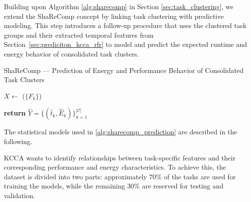 Building upon Algorithm \ref{alg:sharecomp} in Section \ref{sec:task_clustering}, we extend the ShaReComp concept by linking task clustering with predictive modeling. This step introduces a follow-up procedure that uses the clustered task groups and their extracted temporal features from Section~\ref{sec:prediciton_kcca_rfr} to model and predict the expected runtime and energy behavior of consolidated task clusters.

\begin{algorithm}[H]
    \caption{ShaReComp — Prediction of Energy and Performance Behavior of Consolidated Task Clusters}
    \label{alg:sharecomp_prediction}


    \BlankLine
    $X \gets$ \Build($\{F_k\}$) 

    \BlankLine
    \BlankLine
    \textbf{return } $\hat{Y} = \{ (\hat{t}_k, \hat{E}_k) \}_{k=1}^{|\mathcal{C}|}$
\end{algorithm}

The statistical models used in \ref{alg:sharecomp_prediction} are described in the following.

\label{sec:KCCA}
KCCA wants to identify relationships between task-specific features and their corresponding performance and energy characteristics. To achieve this, the dataset is divided into two parts: approximately 70\% of the tasks are used for training the models, while the remaining 30\% are reserved for testing and validation.

